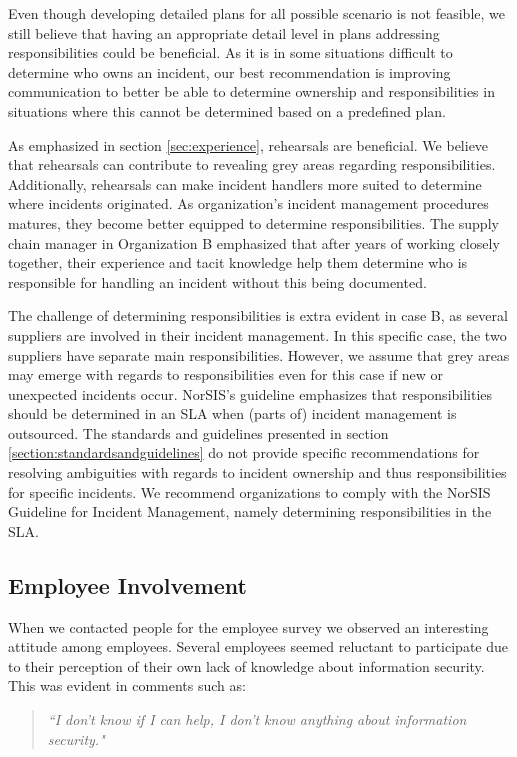 Even though developing detailed plans for all possible scenario is not feasible, we still believe that having an appropriate detail level in plans addressing responsibilities could be beneficial. As it is in some situations difficult to determine who owns an incident, our best recommendation is improving communication to better be able to determine ownership and responsibilities in situations where this cannot be determined based on a predefined plan.

As emphasized in section \ref{sec:experience}, rehearsals are beneficial. We believe that rehearsals can contribute to revealing grey areas regarding responsibilities. Additionally, rehearsals can make incident handlers more suited to determine where incidents originated. As organization's incident management procedures matures, they become better equipped to determine responsibilities. The supply chain manager in Organization B emphasized that after years of working closely together, their experience and tacit knowledge help them determine who is responsible for handling an incident without this being documented. 

The challenge of determining responsibilities is extra evident in case B, as several suppliers are involved in their incident management. In this specific case, the two suppliers have separate main responsibilities. However, we assume that grey areas may emerge with regards to responsibilities even for this case if new or unexpected incidents occur. NorSIS's guideline emphasizes that responsibilities should be determined in an SLA when (parts of) incident management is outsourced. The standards and guidelines presented in section \ref{section:standardsandguidelines} do not provide specific recommendations for resolving ambiguities with regards to incident ownership and thus responsibilities for specific incidents. We recommend organizations to comply with the NorSIS Guideline for Incident Management, namely determining responsibilities in the \ac{SLA}.


\subsection{Employee Involvement}
When we contacted people for the employee survey we observed an interesting attitude among employees. Several employees seemed reluctant to participate due to their perception of their own lack of knowledge about information security. This was evident in comments such as:

\begin{quote}
\textit{``I don't know if I can help, I don't know anything about information security."}
\end{quote}

